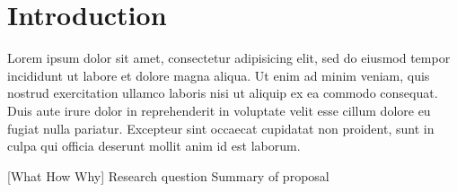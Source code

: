 \chapter{Introduction}\label{ch:introduction}
Lorem ipsum dolor sit amet, consectetur adipisicing elit, sed do eiusmod
tempor incididunt ut labore et dolore magna aliqua. Ut enim ad minim veniam,
quis nostrud exercitation ullamco laboris nisi ut aliquip ex ea commodo
consequat. Duis aute irure dolor in reprehenderit in voluptate velit esse
cillum dolore eu fugiat nulla pariatur. Excepteur sint occaecat cupidatat non
proident, sunt in culpa qui officia deserunt mollit anim id est laborum.

[What How Why]
Research question
Summary of proposal





